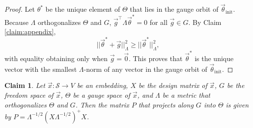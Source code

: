 \documentclass{article}
\numberwithin{myclaim}{section}
\newcommand{\myinit}{\mathrm{init}}
\newtheorem{claim}{Claim}
\begin{document}
\begin{proof}
Let $\theta^*$ be the unique element of $\Theta$ that lies in the gauge orbit of $\vec{\theta}_\myinit$. Because $\Lambda$ orthogonalizes $\Theta$ and $G$, $\vec{g}^\top \Lambda \vec{\theta}^* = 0$ for all $\vec{g} \in G$. By Claim \ref{claim:appendix}, 
\begin{equation}
    ||\vec{\theta}^* + \vec{g}||^2_\Lambda \geq ||\vec{\theta}^*||^2_\Lambda,
\end{equation}
with equality obtaining only when $\vec{g} = \vec{0}$. This proves that $\vec{\theta}^*$ is the unique vector with the smallest $\Lambda$-norm of any vector in the gauge orbit of $\vec{\theta}_\myinit$.
\end{proof}

\begin{claim}
Let $\vec{x}:\mathcal{S} \to V$ be an embedding, $X$ be the design matrix of $\vec{x}$, $G$ be the freedom space of $\vec{x}$, $\Theta$ be a gauge space of $\vec{x}$, and $\Lambda$ be a metric that orthogonalizes $\Theta$ and $G$. Then the matrix $P$ that projects along $G$ into $\Theta$ is given by $P = \Lambda^{-1/2} (X \Lambda^{-1/2})^+ X$.
\end{claim}
\end{document}
